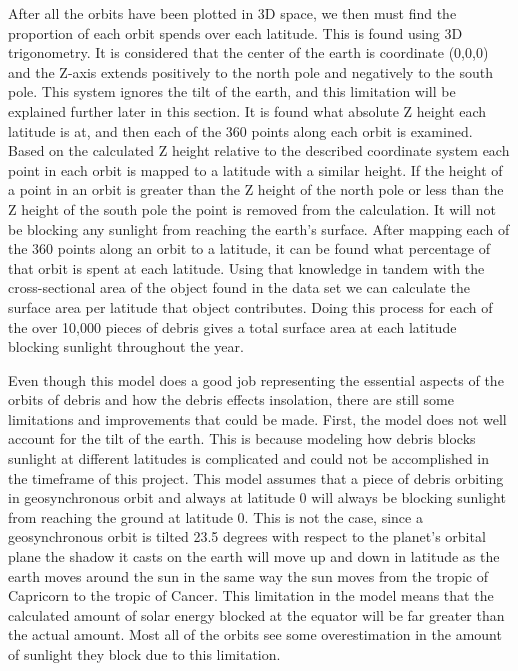 \documentclass[11pt]{article}
\begin{document}
\begin{multicols*}{2}
After all the orbits have been plotted in 3D space, we then must find the proportion of each orbit spends over each latitude. This is found using 3D trigonometry. It is considered that the center of the earth is coordinate (0,0,0) and the Z-axis extends positively to the north pole and negatively to the south pole. This system ignores the tilt of the earth, and this limitation will be explained further later in this section. It is found what absolute Z height each latitude is at, and then each of the 360 points along each orbit is examined. Based on the calculated Z height relative to the described coordinate system each point in each orbit is mapped to a latitude with a similar height. If the height of a point in an orbit is greater than the Z height of the north pole or less than the Z height of the south pole the point is removed from the calculation. It will not be blocking any sunlight from reaching the earth's surface. After mapping each of the 360 points along an orbit to a latitude, it can be found what percentage of that orbit is spent at each latitude. Using that knowledge in tandem with the cross-sectional area of the object found in the data set we can calculate the surface area per latitude that object contributes.\cite{dataset} Doing this process for each of the over 10,000 pieces of debris gives a total surface area at each latitude blocking sunlight throughout the year. 

Even though this model does a good job representing the essential aspects of the orbits of debris and how the debris effects insolation, there are still some limitations and improvements that could be made. First, the model does not well account for the tilt of the earth. This is because modeling how debris blocks sunlight at different latitudes is complicated and could not be accomplished in the timeframe of this project. This model assumes that a piece of debris orbiting in geosynchronous orbit and always at latitude 0 will always be blocking sunlight from reaching the ground at latitude 0. This is not the case, since a geosynchronous orbit is tilted 23.5 degrees with respect to the planet's orbital plane the shadow it casts on the earth will move up and down in latitude as the earth moves around the sun in the same way the sun moves from the tropic of Capricorn to the tropic of Cancer. This limitation in the model means that the calculated amount of solar energy blocked at the equator will be far greater than the actual amount. Most all of the orbits see some overestimation in the amount of sunlight they block due to this limitation.


\end{multicols*}
\end{document}
